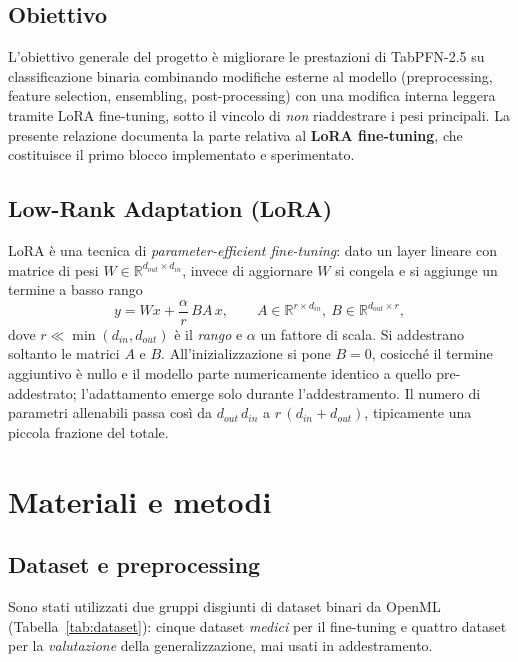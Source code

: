 \documentclass[11pt,a4paper]{article}
\begin{document}
\subsection{Obiettivo}
L'obiettivo generale del progetto è migliorare le prestazioni di TabPFN-2.5 su
classificazione binaria combinando modifiche esterne al modello (preprocessing,
feature selection, ensembling, post-processing) con una modifica interna
leggera tramite LoRA fine-tuning, sotto il vincolo di \emph{non} riaddestrare i
pesi principali. La presente relazione documenta la parte relativa al
\textbf{LoRA fine-tuning}, che costituisce il primo blocco implementato e
sperimentato.

\subsection{Low-Rank Adaptation (LoRA)}
LoRA è una tecnica di \emph{parameter-efficient fine-tuning}: dato un layer
lineare con matrice di pesi $W \in \mathbb{R}^{d_{out}\times d_{in}}$, invece di
aggiornare $W$ si congela e si aggiunge un termine a basso rango
\begin{equation}
  y = Wx + \frac{\alpha}{r}\, B A\, x,
  \qquad A \in \mathbb{R}^{r\times d_{in}},\ B \in \mathbb{R}^{d_{out}\times r},
  \label{eq:lora}
\end{equation}
dove $r \ll \min(d_{in},d_{out})$ è il \emph{rango} e $\alpha$ un fattore di
scala. Si addestrano soltanto le matrici $A$ e $B$. All'inizializzazione si pone
$B = 0$, cosicché il termine aggiuntivo è nullo e il modello parte
numericamente identico a quello pre-addestrato; l'adattamento emerge solo
durante l'addestramento. Il numero di parametri allenabili passa così da
$d_{out}\,d_{in}$ a $r\,(d_{in}+d_{out})$, tipicamente una piccola frazione del
totale.

\section{Materiali e metodi}

\subsection{Dataset e preprocessing}
Sono stati utilizzati due gruppi disgiunti di dataset binari da OpenML
(Tabella~\ref{tab:dataset}): cinque dataset \emph{medici} per il fine-tuning e
quattro dataset per la \emph{valutazione} della generalizzazione, mai usati in
addestramento.
\end{document}
